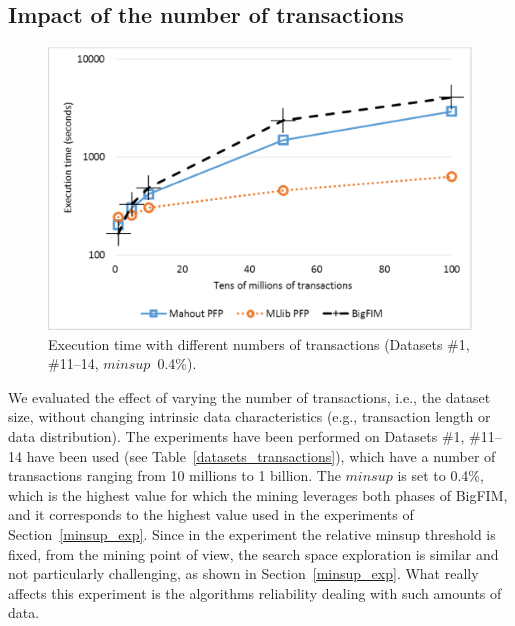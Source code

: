 \documentclass[preprint,review,12pt]{elsarticle}
\begin{document}




\subsection{Impact of the number of transactions}
\label{transaction_exp}

\begin{figure}[!t]
\includegraphics[width=5in]{transactions_log.eps}
\caption{Execution time with different numbers of transactions
 (Datasets \#1, \#11--14,
 $minsup$~0.4\%).}
\label{transactions}
\end{figure}

We evaluated the effect of varying the number of transactions,
i.e., the dataset size, without changing intrinsic data characteristics (e.g., 
transaction length or data distribution).
The experiments have been performed on Datasets \#1, \#11--14 have been used
(see Table~\ref{datasets_transactions}),
which have a number of transactions
ranging from 10 millions to 1 billion.
The $minsup$ is set to 0.4\%,
which is the highest value for which the mining leverages both phases of
BigFIM, and it corresponds to the highest value used
in the experiments of Section~\ref{minsup_exp}.
Since in the experiment the relative minsup threshold is fixed, from the mining point of view, the search space exploration is similar and not particularly challenging, as shown in Section~\ref{minsup_exp}. What really affects this experiment is the algorithms reliability dealing with such amounts of data.
\end{document}
